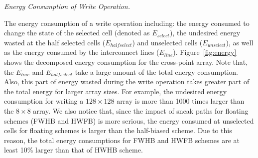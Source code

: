 \vspace{6pt} \emph{Energy Consumption of Write Operation.} \vspace{6pt}

The energy consumption of a write operation including: the energy consumed
to change the state of the selected cell (denoted as $E_{select}$), the
undesired energy wasted at the half selected cells ($E_{halfselect}$) and
unselected cells ($E_{unselect}$), as well as the energy consumed by the
interconnect lines ($E_{line}$). Figure~\ref{fig:energy} shows the
decomposed energy consumption for the cross-point array. Note that, the
$E_{line}$ and $E_{halfselect}$ take a large amount of the total energy
consumption. Also, this part of energy wasted during the write operation
takes greater part of the total energy for larger array sizes. For
example, the undesired energy consumption for writing a $128{\times}128$
array is more than 1000 times larger than the $8{\times}8$ array. We also
notice that, since the impact of sneak paths for floating schemes (FWHB
and HWFB) is more serious, the energy consumed at unselected cells for
floating schemes is larger than the half-biased scheme. Due to this
reason, the total energy consumptions for FWHB and HWFB schemes are at
least 10\% larger than that of HWHB scheme.

